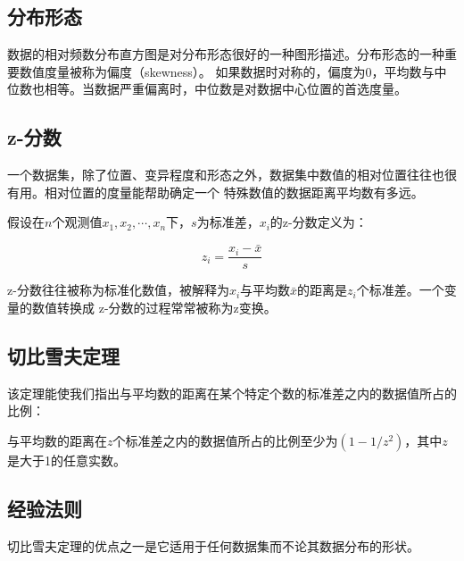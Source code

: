 \documentclass[a4paper]{ctexrep}
\begin{document}
\subsection{分布形态}
数据的相对频数分布直方图是对分布形态很好的一种图形描述。分布形态的一种重要数值度量被称为偏度（skewness）。
如果数据时对称的，偏度为0，平均数与中位数也相等。当数据严重偏离时，中位数是对数据中心位置的首选度量。

\subsection{z-分数}
一个数据集，除了位置、变异程度和形态之外，数据集中数值的相对位置往往也很有用。相对位置的度量能帮助确定一个
特殊数值的数据距离平均数有多远。

假设在$n$个观测值$x_{1}, x_{2}, \cdots, x_{n}$下，$s$为标准差，$x_{i}$的z-分数定义为：

\[z_{i}=\frac{x_{i}-\bar{x}}{s}\]

z-分数往往被称为标准化数值，被解释为$x_{i}$与平均数$\bar{x}$的距离是$z_{i}$个标准差。一个变量的数值转换成
z-分数的过程常常被称为z变换。

\subsection{切比雪夫定理}
该定理能使我们指出与平均数的距离在某个特定个数的标准差之内的数据值所占的比例：

与平均数的距离在$z$个标准差之内的数据值所占的比例至少为$(1-1/z^{2})$，其中$z$是大于1的任意实数。

\subsection{经验法则}
切比雪夫定理的优点之一是它适用于任何数据集而不论其数据分布的形状。
\end{document}
